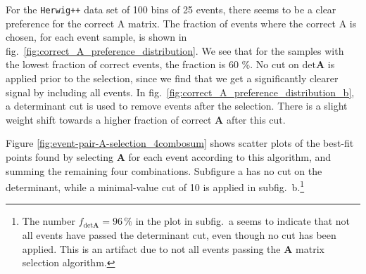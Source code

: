 \documentclass[twoside,english]{uiofysmaster}
\begin{document}
For the {\tt Herwig++} data set of 100 bins of 25 events, there seems to be a clear preference for the correct A matrix. The fraction of events where the correct A is chosen, for each event sample, is shown in fig.\ \ref{fig:correct_A_preference_distribution}. We see that for the samples with the lowest fraction of correct events, the fraction is 60 \%. No cut on $\mathrm{det}\mathbf{A}$ is applied prior to the selection, since we find that we get a significantly clearer signal by including all events. In fig.\ \ref{fig:correct_A_preference_distribution_b}, a determinant cut is used to remove events after the selection. There is a slight weight shift towards a higher fraction of correct $\mathbf{A}$ after this cut.

Figure \ref{fig:event-pair-A-selection_4combosum} shows scatter plots of the best-fit points found by selecting $\mathbf{A}$ for each event according to this algorithm, and summing the remaining four combinations. Subfigure a has no cut on the determinant, while a minimal-value cut of 10 is applied in subfig.\ b.\footnote{The number $f_{\mathrm{det}\mathbf A} = 96\,\%$ in the plot in subfig.\ a seems to indicate that not all events have passed the determinant cut, even though no cut has been applied. This is an artifact due to not all events passing the $\mathbf{A}$ matrix selection algorithm.}
\end{document}
